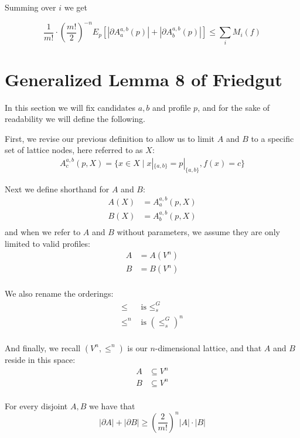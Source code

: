	Summing over $i$ we get

	\begin{corollary}
		\[
			\frac{1}{m!} \cdot \left(\frac{m!}{2}\right)^{-n} E_p[|\partial A^{a,b}_a(p)| + |\partial A^{a,b}_b(p)|] \le \sum_i M_i(f)
		\]
	\end{corollary}


\section{Generalized Lemma 8 of Friedgut}

	In this section we will fix candidates $a, b$ and profile $p$, and for the sake of readability we will define the following.

	First, we revise our previous definition to allow us to limit $A$ and $B$ to a specific set of lattice nodes, here referred to as $X$:
	\begin{align*}
		A^{a,b}_c(p, X) = \{x \in X \mid x|_{\{a,b\}} = p|_{\{a,b\}}, f(x) = c\}
	\end{align*}

	Next we define shorthand for $A$ and $B$:
	\begin{align*}
		A(X) &= A^{a,b}_a(p, X) \\
		B(X) &= A^{a,b}_b(p, X) \\
	\end{align*}
	and when we refer to $A$ and $B$ without parameters, we assume they are only limited to valid profiles:
	\begin{align*}
		A &= A(V^n) \\
		B &= B(V^n) \\
	\end{align*}

	We also rename the orderings:
	\begin{align*}
		\le &\textrm{ is } \le_s^G \\
		\le^n &\textrm{ is } (\le_s^G)^n \\
	\end{align*}

	And finally, we recall $(V^n, \le^n)$ is our $n$-dimensional lattice, and that $A$ and $B$ reside in this space:
	\begin{align*}
		A &\subseteq V^n \\
		B &\subseteq V^n \\
	\end{align*}

	\begin{lemma}
		\label{friedgut-lemma-8}
		For every disjoint $A, B$ we have that
		\[
			|\partial A| + |\partial B| \ge \left( \frac{2}{m!} \right)^n |A| \cdot |B|
		\]
	\end{lemma}


